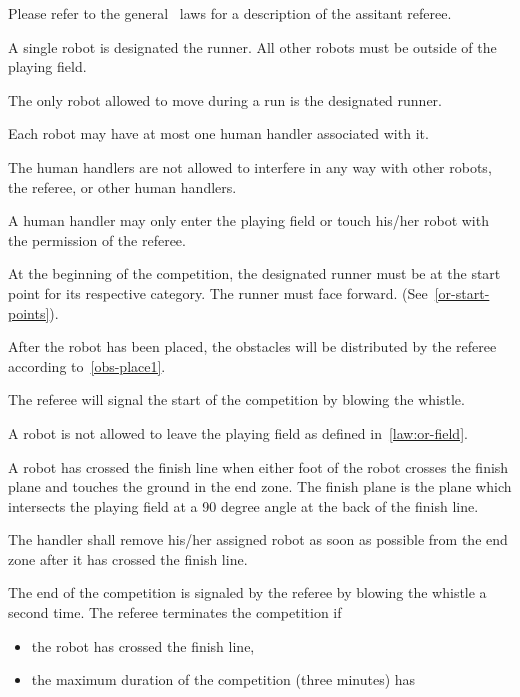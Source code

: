 \documentclass[12pt]{hurocup}
\begin{document}

Please refer to the general \HuroCup\ laws for a description of
the assitant referee.


\begin{lawlist}[OR]

\item A single robot is designated the runner. All other robots
  must be outside of the playing field.
\item The only robot allowed to move during a run is the
  designated runner.
\item Each robot may have at most one human handler associated with
  it. 
\item \label{or-handler5} The human handlers are not allowed to
  interfere in any way with other robots, the referee, or other human
  handlers.
\item \label{or-handler6} A human handler may only enter the playing
  field or touch his/her robot with the permission of the referee.
\item At the beginning of the competition, the designated runner must
  be at the start point for its respective category. The runner must
  face forward. (See~\ref{or-start-points}).
\item After the robot has been placed, the obstacles will be
  distributed by the referee according
  to~\ref{obs-place1}.
\item The referee will signal the start of the competition by blowing
  the whistle.
\item A robot is not allowed to leave the playing field as defined
  in~\ref{law:or-field}. 
\item A robot has crossed the finish line when either foot of the
  robot crosses the finish plane and touches the ground in the end
  zone. The finish plane is the plane which intersects the playing
  field at a 90 degree angle at the back of the finish line.
\item The handler shall remove his/her assigned robot as soon as
  possible from the end zone after it has crossed the finish line.
\item The end of the competition is signaled by the referee by
  blowing the whistle a second time.
  The referee terminates the competition if
  \begin{itemize}
  \item the robot has crossed the finish line,
  \item the maximum duration of the competition (three minutes) has

\end{itemize}
\end{lawlist}
\end{document}
